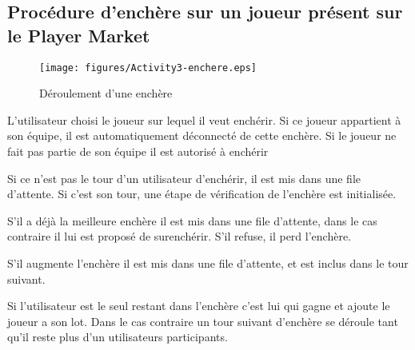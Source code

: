 \subsection{Procédure d'enchère sur un joueur présent sur le Player Market}
\label{fig:Enchere}
\begin{figure}[h!]
  \centering
  \texttt{[image: figures/Activity3-enchere.eps]}
  \caption{\label{fig:Enchere} Déroulement d'une enchère}
\end{figure}
\begin{list}{}{\leftmargin=1.5em}
\item{L'utilisateur choisi le joueur sur lequel il veut enchérir. Si ce joueur appartient à son équipe, il est automatiquement déconnecté de cette enchère. Si le joueur ne fait pas partie de son équipe il est autorisé à enchérir}
\item{Si ce n'est pas  le tour d'un utilisateur d'enchérir, il est mis dans une file d'attente. Si c'est son tour, une étape de vérification de l'enchère est initialisée.}
\item{S'il a déjà la meilleure enchère il est mis dans une file d'attente, dans le cas contraire il lui est proposé de surenchérir. S'il refuse, il perd l'enchère.}
\item{S'il augmente l'enchère il est mis dans une file d'attente, et est inclus dans le tour suivant.}
\item{Si l'utilisateur est le seul restant dans l'enchère c'est lui qui gagne et ajoute le joueur a son lot. Dans le cas contraire un tour suivant d'enchère se déroule tant qu'il reste plus d'un utilisateurs participants.}
\end{list}
%
%
%
